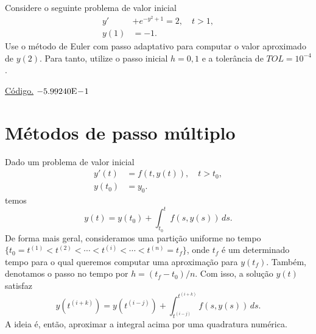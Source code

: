 \begin{exer}
  Considere o seguinte problema de valor inicial
  \begin{align}
    y' &+ e^{-y^2+1} = 2,\quad t>1,\\
    y(1) &= -1.
  \end{align}
Use o método de Euler com passo adaptativo para computar o valor aproximado de $y(2)$. Para tanto, utilize o passo inicial $h=0,1$ e a tolerância de $TOL=10^{-4}$.
\end{exer}
\begin{resp}
  \ifisoctave 
  \href{https://github.com/phkonzen/notas/blob/master/src/MatematicaNumerica/cap_pvi/dados/exer_Euler_adap/exer_Euler_adap.m}{Código.} 
  \fi
  $-5.99240\mathrm{E}\!-\!1$
\end{resp}


\section{Métodos de passo múltiplo}\label{cap_pvi_sec_passo_mult}

Dado um problema de valor inicial
\begin{align}
  y'(t) &= f(t,y(t)),\quad t>t_0,\\
  y(t_0) &= y_0.
\end{align}
temos
\begin{equation}
  y(t) = y(t_0) + \int_{t_0}^t f(s,y(s))\,ds.
\end{equation}
De forma mais geral, consideramos uma partição uniforme no tempo $\{t_0=t^{(1)} < t^{(2)} < \cdots < t^{(i)} < \cdots < t^{(n)}=t_f\}$, onde $t_f$ é um determinado tempo para o qual queremos computar uma aproximação para $y(t_f)$. Também, denotamos o passo no tempo por $h=(t_f-t_0)/n$. Com isso, a solução $y(t)$ satisfaz
\begin{equation}
  y\left(t^{(i+k)}\right) = y\left(t^{(i-j)}\right) + \int_{t^{(i-j)}}^{t^{(i+k)}} f(s,y(s))\,ds.
\end{equation}
A ideia é, então, aproximar a integral acima por uma quadratura numérica.

